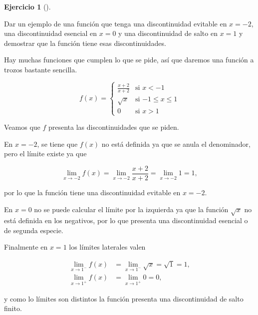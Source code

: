 \documentclass[
  spanish,
  a4paper,
]{scrreport}
\theoremstyle{definition}
\newtheorem{exercise}{Ejercicio}[chapter]
\theoremstyle{remark}
\begin{document}
\begin{exercise}[]\protect\hypertarget{exr-8}{}\label{exr-8}

Dar un ejemplo de una función que tenga una discontinuidad evitable en
\(x=-2\), una discontinuidad esencial en \(x=0\) y una discontinuidad de
salto en \(x=1\) y demostrar que la función tiene esas discontinuidades.

\end{exercise}

\begin{tcolorbox}[enhanced jigsaw, arc=.35mm, bottomrule=.15mm, bottomtitle=1mm, breakable, colback=white, colbacktitle=quarto-callout-tip-color!10!white, colframe=quarto-callout-tip-color-frame, coltitle=black, left=2mm, leftrule=.75mm, opacityback=0, opacitybacktitle=0.6, rightrule=.15mm, title=\textcolor{quarto-callout-tip-color}{\faLightbulb}\hspace{0.5em}{Solución}, titlerule=0mm, toprule=.15mm, toptitle=1mm]

Hay muchas funciones que cumplen lo que se pide, así que daremos una
función a trozos bastante sencilla.

\[
f(x) =
\begin{cases}
\frac{x+2}{x+2} & \mbox {si $x<-1$}\\
\sqrt{x} & \mbox{si $-1\leq x \leq 1$}\\
0 & \mbox{si $x> 1$}
\end{cases}
\]

Veamos que \(f\) presenta las discontinuidades que se piden.

En \(x=-2\), se tiene que \(f(x)\) no está definida ya que se anula el
denominador, pero el límite existe ya que

\[
\lim_{x\to -2} f(x) 
= \lim_{x\to -2} \frac{x+2}{x+2} 
= \lim_{x\to -2} 1
= 1,
\]

por lo que la función tiene una discontinuidad evitable en \(x=-2\).

En \(x=0\) no se puede calcular el límite por la izquierda ya que la
función \(\sqrt{x}\) no está definida en los negativos, por lo que
presenta una discontinuidad esencial o de segunda especie.

Finalmente en \(x=1\) los límites laterales valen

\begin{align*}
\lim_{x\to 1^-} f(x)
&= \lim_{x\to 1^-} \sqrt{x}  
= \sqrt{1}
= 1,\\
\lim_{x\to 1^+} f(x) 
&= \lim_{x\to 1^+} 0 
= 0,
\end{align*}

y como lo límites son distintos la función presenta una discontinuidad
de salto finito.

\end{tcolorbox}
\end{document}
